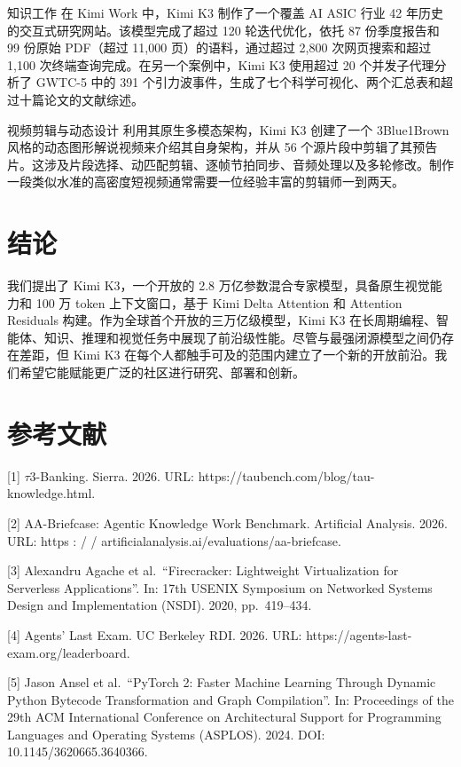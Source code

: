\documentclass[
  10
]{article}
\begin{document}
知识工作 在 Kimi Work 中，Kimi K3 制作了一个覆盖 AI ASIC 行业 42 年历史的交互式研究网站。该模型完成了超过 120 轮迭代优化，依托 87 份季度报告和 99 份原始 PDF（超过 11,000 页）的语料，通过超过 2,800 次网页搜索和超过 1,100 次终端查询完成。在另一个案例中，Kimi K3 使用超过 20 个并发子代理分析了 GWTC-5 中的 391 个引力波事件，生成了七个科学可视化、两个汇总表和超过十篇论文的文献综述。

视频剪辑与动态设计 利用其原生多模态架构，Kimi K3 创建了一个 3Blue1Brown 风格的动态图形解说视频来介绍其自身架构，并从 56 个源片段中剪辑了其预告片。这涉及片段选择、动匹配剪辑、逐帧节拍同步、音频处理以及多轮修改。制作一段类似水准的高密度短视频通常需要一位经验丰富的剪辑师一到两天。

\section{结论}\label{conclusion}

我们提出了 Kimi K3，一个开放的 2.8 万亿参数混合专家模型，具备原生视觉能力和 100 万 token 上下文窗口，基于 Kimi Delta Attention 和 Attention Residuals 构建。作为全球首个开放的三万亿级模型，Kimi K3 在长周期编程、智能体、知识、推理和视觉任务中展现了前沿级性能。尽管与最强闭源模型之间仍存在差距，但 Kimi K3 在每个人都触手可及的范围内建立了一个新的开放前沿。我们希望它能赋能更广泛的社区进行研究、部署和创新。
\section*{参考文献}\label{references}

{[}1{]} $\tau$3-Banking. Sierra. 2026. URL:
https://taubench.com/blog/tau-knowledge.html.

{[}2{]} AA-Briefcase: Agentic Knowledge Work Benchmark. Artificial
Analysis. 2026. URL: https : / /
artificialanalysis.ai/evaluations/aa-briefcase.

{[}3{]} Alexandru Agache et al.~``Firecracker: Lightweight
Virtualization for Serverless Applications''. In: 17th USENIX Symposium
on Networked Systems Design and Implementation (NSDI). 2020,
pp.~419--434.

{[}4{]} Agents' Last Exam. UC Berkeley RDI. 2026. URL:
https://agents-last-exam.org/leaderboard.

{[}5{]} Jason Ansel et al.~``PyTorch 2: Faster Machine Learning Through
Dynamic Python Bytecode Transformation and Graph Compilation''. In:
Proceedings of the 29th ACM International Conference on Architectural
Support for Programming Languages and Operating Systems (ASPLOS). 2024.
DOI: 10.1145/3620665.3640366.
\end{document}
